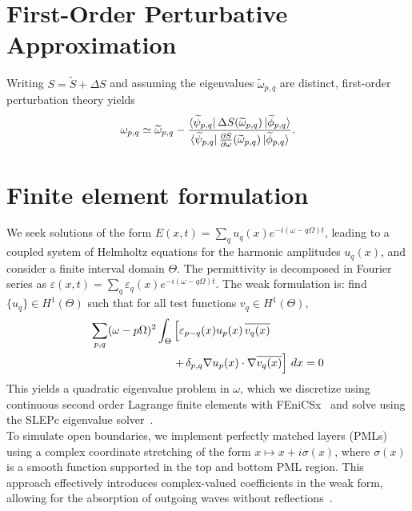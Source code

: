 \documentclass[%
 reprint,
 amsmath,amssymb,
 aps,
 prb,
]{revtex4-2}
\begin{document}
\begin{appendix}
\section{First-Order Perturbative Approximation}
\label{sec:pert}

Writing $S = \widetilde{S} + \Delta S$ and assuming the eigenvalues $\widetilde{\omega}_{p,q}$ are distinct, first-order perturbation theory \citep{cohen1991quantum} yields
\begin{equation}
{\omega}_{p,q} \simeq \widetilde{\omega}_{p,q} - \frac{\bra{\widetilde{\psi}_{p,q}} \Delta S(\widetilde{\omega}_{p,q}) \ket{\widetilde{\phi}_{p,q}}}{\bra{\widetilde{\psi}_{p,q}} \frac{\partial S}{\partial \omega}(\widetilde{\omega}_{p,q})\ket{\widetilde{\phi}_{p,q}}}.
\end{equation}


\section{Finite element formulation}
\label{app:fem}

We seek solutions of the form $E(x, t) = \sum_{q} u_q(x) e^{-i(\omega - q\Omega)t}$, leading to a coupled system of Helmholtz equations for the harmonic amplitudes $u_q(x)$, and consider a finite interval domain $\Theta$. The permittivity is decomposed in Fourier series as $\varepsilon(x, t) = \sum_{q} \varepsilon_q(x) e^{-i(\omega - q\Omega)t}$. The weak formulation is: find $\{u_q\} \in H^1(\Theta)$ such that for all test functions $v_q \in H^1(\Theta)$,
\begin{align}
\sum_{p,q}  (\omega - p\Omega)^2 \int_\Theta &\left[ \varepsilon_{p-q}(x)u_p(x) \, \overline{v_q(x)} \right. \notag \\
&\left. + \, \delta_{p,q} \nabla u_p(x) \cdot \nabla \overline{v_q(x)} \right] \, dx = 0
\end{align}
This yields a quadratic eigenvalue problem in $\omega$, which we discretize using continuous second order Lagrange finite elements with FEniCSx~\cite{dolfinx2024} and solve using the SLEPc eigenvalue solver~\cite{slepc2005}.\\
To simulate open boundaries, we implement perfectly matched layers (PMLs) using a complex coordinate stretching of the form $x \mapsto x + i\sigma(x)$, where $\sigma(x)$ is a smooth function supported in the top and bottom PML region. This approach effectively introduces complex-valued coefficients in the weak form, allowing for the absorption of outgoing waves without reflections~\cite{chew1994pml}.


\end{appendix}
\end{document}
